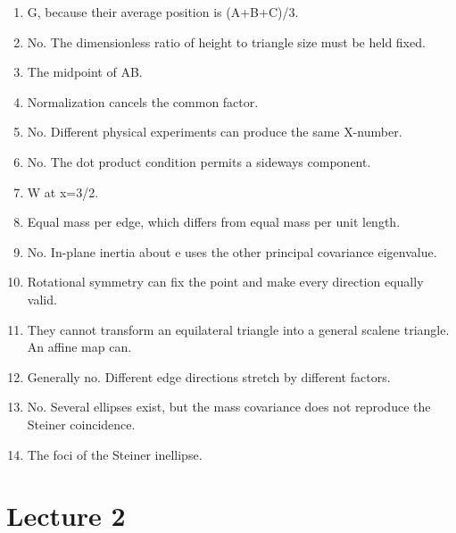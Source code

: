 \documentclass[11pt,oneside,openany]{book}
\begin{document}
\begin{enumerate}

\item G, because their average position is (A+B+C)/3.

\item No. The dimensionless ratio of height to triangle size must be held fixed.

\item The midpoint of AB.

\item Normalization cancels the common factor.

\item No. Different physical experiments can produce the same X-number.

\item No. The dot product condition permits a sideways component.

\item W at x=3/2.

\item Equal mass per edge, which differs from equal mass per unit length.

\item No. In-plane inertia about e uses the other principal covariance eigenvalue.

\item Rotational symmetry can fix the point and make every direction equally valid.

\item They cannot transform an equilateral triangle into a general scalene triangle. An affine map can.

\item Generally no. Different edge directions stretch by different factors.

\item No. Several ellipses exist, but the mass covariance does not reproduce the Steiner coincidence.

\item The foci of the Steiner inellipse.

\end{enumerate}

\section{Lecture 2}
\end{document}
